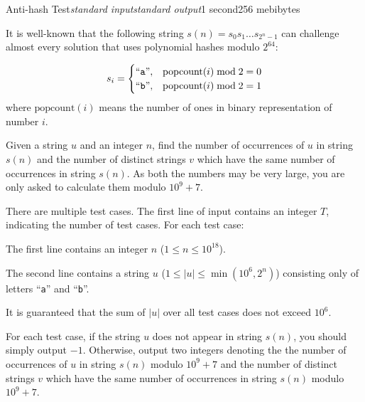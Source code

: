 \begin{problem}{Anti-hash Test}{\textsl{standard input}}{\textsl{standard output}}{1 second}{256 mebibytes}

It is well-known that the following string $s(n) = s_0 s_1 \ldots s_{2^n-1}$ can challenge almost every solution that uses polynomial hashes modulo $2^{64}$: 

$$
s_i = \begin{cases}
\text{``\texttt{a}''}, & \mathrm{popcount}(i) \bmod 2 = 0 \\
\text{``\texttt{b}''}, & \mathrm{popcount}(i) \bmod 2 = 1
\end{cases}
$$
where $\mathrm{popcount}(i)$ means the number of ones in binary representation of number $i$.

Given a string $u$ and an integer $n$, find the number of occurrences of $u$ in string $s(n)$ and the number of distinct strings $v$ which have the same number of occurrences in string $s(n)$. As both the numbers may be very large, you are only asked to calculate them modulo $10^9 + 7$.

\InputFile
There are multiple test cases. The first line of input contains an integer $T$, indicating the number of test cases. For each test case:

The first line contains an integer $n$ ($1 \le n \le 10^{18}$).

The second line contains a string $u$ ($1 \le |u| \le \min(10^6, 2^n)$) consisting only of letters ``\texttt{a}'' and ``\texttt{b}''.

It is guaranteed that the sum of $|u|$ over all test cases does not exceed $10^6$.


\OutputFile
For each test case, if the string $u$ does not appear in string $s(n)$, you should simply output $-1$. Otherwise, output two integers denoting the the number of occurrences of $u$ in string $s(n)$ modulo $10^9 + 7$ and the number of distinct strings $v$ which have the same number of occurrences in string $s(n)$ modulo $10^9 + 7$.




\Example

\begin{example}
%
\end{example}

\end{problem}

